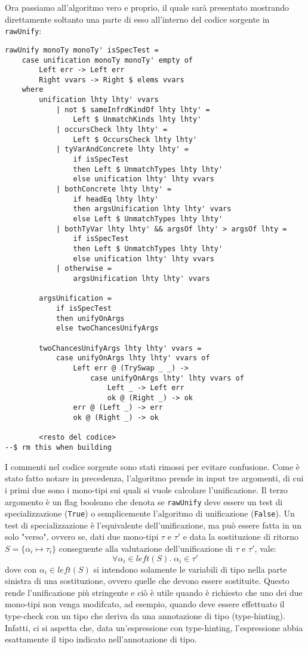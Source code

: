 \documentclass[10pt,a4paper]{article}
\begin{document}
Ora passiamo all'algoritmo vero e proprio, il quale sarà presentato mostrando direttamente soltanto una parte di esso
all'interno del codice sorgente in \texttt{rawUnify}:
\begin{lstlisting}
rawUnify monoTy monoTy' isSpecTest =
    case unification monoTy monoTy' empty of
        Left err -> Left err
        Right vvars -> Right $ elems vvars
    where
        unification lhty lhty' vvars
            | not $ sameInfrdKindOf lhty lhty' =
                Left $ UnmatchKinds lhty lhty'
            | occursCheck lhty lhty' =
                Left $ OccursCheck lhty lhty'
            | tyVarAndConcrete lhty lhty' =
                if isSpecTest
                then Left $ UnmatchTypes lhty lhty'
                else unification lhty' lhty vvars
            | bothConcrete lhty lhty' =
                if headEq lhty lhty'
                then argsUnification lhty lhty' vvars
                else Left $ UnmatchTypes lhty lhty'
            | bothTyVar lhty lhty' && argsOf lhty' > argsOf lhty =
                if isSpecTest
                then Left $ UnmatchTypes lhty lhty'
                else unification lhty' lhty vvars
            | otherwise =
                argsUnification lhty lhty' vvars

        argsUnification =
            if isSpecTest
            then unifyOnArgs
            else twoChancesUnifyArgs

        twoChancesUnifyArgs lhty lhty' vvars =
            case unifyOnArgs lhty lhty' vvars of
                Left err @ (TrySwap _ _) ->
                    case unifyOnArgs lhty' lhty vvars of
                        Left _ -> Left err
                        ok @ (Right _) -> ok
                err @ (Left _) -> err
                ok @ (Right _) -> ok

        <resto del codice>
--$ rm this when building
\end{lstlisting}
I commenti nel codice sorgente sono stati rimossi per evitare confusione. Come è stato fatto notare in precedenza,
l'algoritmo prende in input tre argomenti, di cui i primi due sono i mono-tipi sui quali si vuole calcolare l'unificazione.
Il terzo argomento è un flag booleano che denota se \texttt{rawUnify} deve essere un test di specializzazione
(\texttt{True}) o semplicemente l'algoritmo di unificazione (\texttt{False}). Un test di specializzazione è l'equivalente
dell'unificazione, ma può essere fatta in un solo "verso", ovvero se, dati due mono-tipi $ \tau $ e $ \tau' $ e data
la sostituzione di ritorno $ S = \{ \alpha_i \mapsto \tau_i \} $ conseguente alla valutazione dell'unificazione di
$ \tau $ e $ \tau' $, vale:
\[ \forall \alpha_i \in left(S). \; \alpha_i \in \tau' \]
dove con $ \alpha_i \in left(S) $ si intendono solamente le variabili di tipo nella parte sinistra di una sostituzione,
ovvero quelle che devono essere sostituite. Questo rende l'unificazione più stringente
e ciò è utile quando è richiesto che uno dei due mono-tipi non venga modifcato,
ad esempio, quando deve essere effettuato il type-check con un tipo che deriva da una annotazione di tipo (type-hinting).
Infatti, ci si aspetta che, data un'espressione con type-hinting, l'espressione abbia esattamente il tipo indicato
nell'annotazione di tipo.
\end{document}
